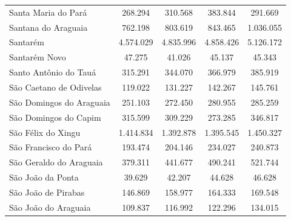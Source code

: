 \begin{table}[!htb]
{\begin{tabular}{l|c|c|c|c}
   Santa Maria do Pará      & 268.294     & 310.568    & 383.844   & 291.669         \\
   Santana do Araguaia      & 762.198     & 803.619    & 843.465   & 1.036.055       \\
   Santarém                 & 4.574.029   & 4.835.996  & 4.858.426 & 5.126.172       \\
   Santarém Novo            & 47.275      & 41.026     & 45.137    & 45.343          \\
   Santo Antônio do Tauá    & 315.291     & 344.070    & 366.979   & 385.919         \\
   São Caetano de Odivelas  & 119.022     & 131.227    & 142.267   & 145.761         \\
   São Domingos do Araguaia & 251.103     & 272.450    & 280.955   & 285.259         \\
   São Domingos do Capim    & 315.599     & 309.229    & 273.285   & 346.817         \\
   São Félix do Xingu       & 1.414.834   & 1.392.878  & 1.395.545 & 1.450.327       \\
   São Francisco do Pará    & 193.474     &  204.146   &  234.027  & 240.873         \\
   São Geraldo do Araguaia  & 379.311     &  441.677   & 490.241   & 521.744         \\
   São João da Ponta        & 39.629      & 42.207     & 44.628    & 46.628           \\
   São João de Pirabas      &  146.869    & 158.977    & 164.333   & 169.548          \\
   São João do Araguaia     & 109.837     & 116.992    &  122.296  & 134.015          \\
\end{tabular}}
\end{table}





